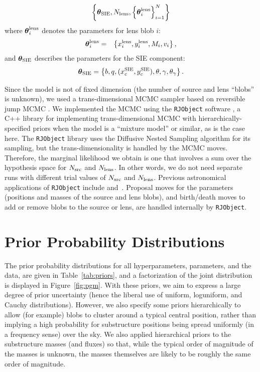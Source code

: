 \documentclass[useAMS,usenatbib]{mn2e}
\begin{document}
\begin{eqnarray}
\left\{
\boldsymbol{\theta}_{\rm SIE},
N_{\rm lens}, \left\{\boldsymbol{\theta}^{\rm lens}_i\right\}_{i=1}^N
\right\}
\end{eqnarray}
where $\boldsymbol{\theta}^{\rm lens}_i$ denotes the parameters for lens blob $i$:
\begin{eqnarray}
\boldsymbol{\theta}^{\rm lens}_i &=& \left\{x_i^{\rm lens}, y_i^{\rm lens}, M_i, v_i
\right\},
\end{eqnarray}
and $\boldsymbol{\theta}_{\rm SIE}$ describes the parameters for the SIE
component:
\begin{eqnarray}
\boldsymbol{\theta}_{\rm SIE} = \left\{
b, q, (x_c^{\rm SIE}, y_c^{\rm SIE}), \theta, \gamma, \theta_\gamma
\right\}.
\end{eqnarray}

Since the model is not of fixed dimension (the number of source and lens
``blobs'' is unknown), we used a trans-dimensional MCMC sampler based on
reversible jump MCMC \citep{green}. We implemented the MCMC using the
{\tt RJObject} software \citep{rjobject}, a C++ library for implementing trans-dimensional MCMC with hierarchically-specified priors when the model is
a ``mixture model'' or similar, as is the case here.
The {\tt RJObject} library uses the
Diffusive Nested Sampling algorithm \citep{dnest} for its sampling, but the
trans-dimensionality is handled by the MCMC moves. Therefore, the marginal
likelihood we obtain is one that involves a sum over the hypothesis space
for $N_{\rm src}$ and $N_{\rm lens}$. In other words, we do not need
separate runs with different trial values of $N_{\rm src}$ and $N_{\rm lens}$.
Previous astronomical
applications of {\tt RJObject} include \citet{magnetron}
and~\citet{exoplanet}. Proposal moves for the parameters (positions and masses
of the source and lens blobs), and birth/death moves to add or remove blobs
to the source or lens, are handled internally by {\tt RJObject}.


\section{Prior Probability Distributions}
The prior probability distributions for all hyperparameters, parameters, and
the data, are given in Table~\ref{tab:priors}, and a factorization of the
joint distribution is displayed in Figure~\ref{fig:pgm}. With these priors,
we aim to express a large degree of prior uncertainty (hence the liberal use
of uniform, loguniform, and Cauchy distributions). However, we also specify
some priors hierarchically to allow (for example)
blobs to cluster around a typical central
position, rather than implying a high probability for substructure positions
being spread uniformly (in a frequency sense) over the sky. We also applied
hierarchical priors to the substructure masses (and fluxes) so that, while
the typical order of magnitude of the masses is unknown, the masses
themselves are likely to be roughly the same order of magnitude.
\end{document}
